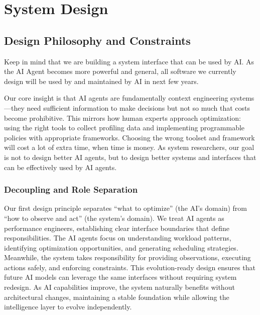 \section{System Design}

\subsection{Design Philosophy and Constraints}

Keep in mind that we are building a system interface that can be used by AI. As the AI Agent becomes more powerful and general, all software we currently design will be used by and maintained by AI in next few years.

Our core insight is that AI agents are fundamentally context engineering systems—they need sufficient information to make decisions but not so much that costs become prohibitive. This mirrors how human experts approach optimization: using the right tools to collect profiling data and implementing programmable policies with appropriate frameworks. Choosing the wrong toolset and framework will cost a lot of extra time, when time is money. As system researchers, our goal is not to design better AI agents, but to design better systems and interfaces that can be effectively used by AI agents.

\subsubsection{Decoupling and Role Separation}
Our first design principle separates ``what to optimize'' (the AI's domain) from ``how to observe and act'' (the system's domain). We treat AI agents as performance engineers, establishing clear interface boundaries that define responsibilities. The AI agents focus on understanding workload patterns, identifying optimization opportunities, and generating scheduling strategies. Meanwhile, the system takes responsibility for providing observations, executing actions safely, and enforcing constraints. This evolution-ready design ensures that future AI models can leverage the same interfaces without requiring system redesign. As AI capabilities improve, the system naturally benefits without architectural changes, maintaining a stable foundation while allowing the intelligence layer to evolve independently.

